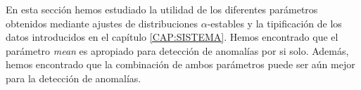 En esta sección hemos estudiado la utilidad de los diferentes parámetros obtenidos mediante ajustes de distribuciones $\alpha$-estables y la tipificación de los datos introducidos en el capítulo \ref{CAP:SISTEMA}. Hemos encontrado que el parámetro \textit{mean} es apropiado para detección de anomalías por si solo. Además, hemos encontrado que la combinación de ambos parámetros puede ser aún mejor para la detección de anomalías.